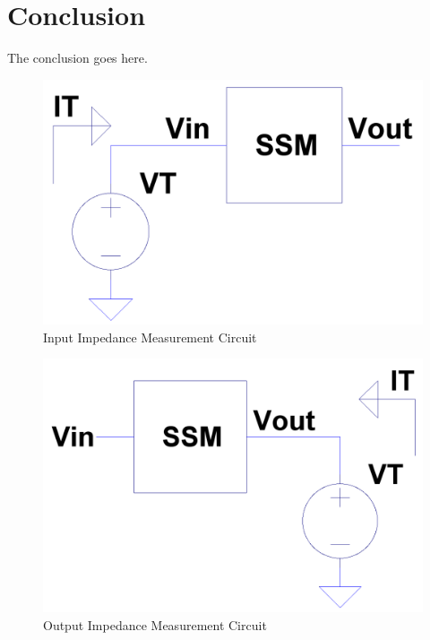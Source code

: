 \documentclass[conference]{IEEEtran}
\begin{document}
\twocolumn
\section{Conclusion}
The conclusion goes here.

\appendix
\label{app:A}
\begin{figure}[!htbp]
  	\centering
  	\includegraphics[scale=0.15]{images/input-z-meas.png}
  	\caption[input-z-meas]{Input Impedance Measurement Circuit}
  	\label{fig:input-z-meas}
	\end{figure}

\begin{figure}[!htbp]
  	\centering
  	\includegraphics[scale=0.15]{images/output-z-meas.png}
  	\caption[output-z-meas]{Output Impedance Measurement Circuit}
  	\label{fig:output-z-meas}
	\end{figure}
\end{document}
